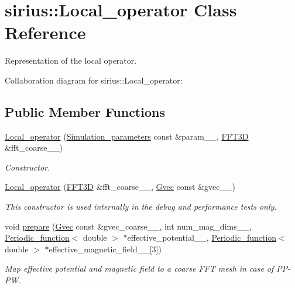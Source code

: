 \hypertarget{classsirius_1_1_local__operator}{}\section{sirius\+:\+:Local\+\_\+operator Class Reference}
\label{classsirius_1_1_local__operator}


Representation of the local operator.  




Collaboration diagram for sirius\+:\+:Local\+\_\+operator\+:
\subsection*{Public Member Functions}
\begin{DoxyCompactItemize}
\item 
\hyperlink{classsirius_1_1_local__operator_ac55ac591269d53b16ae94c7f393edb7d}{Local\+\_\+operator} (\hyperlink{classsirius_1_1_simulation__parameters}{Simulation\+\_\+parameters} const \&param\+\_\+\+\_\+, \hyperlink{classsddk_1_1_f_f_t3_d}{F\+F\+T3\+D} \&fft\+\_\+coarse\+\_\+\+\_\+)
\begin{DoxyCompactList}\small\item\em Constructor. \end{DoxyCompactList}\item 
\hyperlink{classsirius_1_1_local__operator_a3c1463f86fb5a8420fa69390183399d1}{Local\+\_\+operator} (\hyperlink{classsddk_1_1_f_f_t3_d}{F\+F\+T3\+D} \&fft\+\_\+coarse\+\_\+\+\_\+, \hyperlink{classsddk_1_1_gvec}{Gvec} const \&gvec\+\_\+\+\_\+)
\begin{DoxyCompactList}\small\item\em This constructor is used internally in the debug and performance tests only. \end{DoxyCompactList}\item 
void \hyperlink{classsirius_1_1_local__operator_a238f29f51a934041d56dcce740b1c471}{prepare} (\hyperlink{classsddk_1_1_gvec}{Gvec} const \&gvec\+\_\+coarse\+\_\+\+\_\+, int num\+\_\+mag\+\_\+dims\+\_\+\+\_\+, \hyperlink{classsirius_1_1_periodic__function}{Periodic\+\_\+function}$<$ double $>$ $\ast$effective\+\_\+potential\+\_\+\+\_\+, \hyperlink{classsirius_1_1_periodic__function}{Periodic\+\_\+function}$<$ double $>$ $\ast$effective\+\_\+magnetic\+\_\+field\+\_\+\+\_\+\mbox{[}3\mbox{]})
\begin{DoxyCompactList}\small\item\em Map effective potential and magnetic field to a coarse F\+F\+T mesh in case of P\+P-\/\+P\+W. \end{DoxyCompactList}\item 

\end{DoxyCompactItemize}

